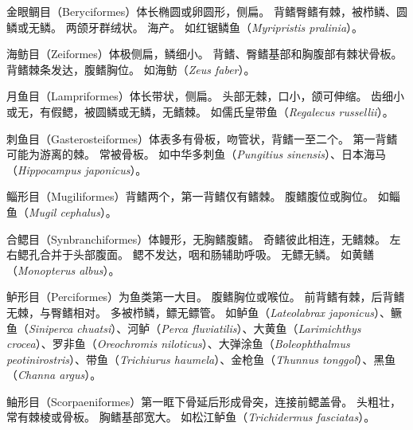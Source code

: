 \documentclass[11pt]{article}
\begin{document}
\newline

金眼鲷目（Beryciformes）体长椭圆或卵圆形，侧扁。
背鳍臀鳍有棘，被栉鳞、圆鳞或无鳞。
两颌牙群绒状。
海产。
如红锯鳞鱼（\textit{Myripristis pralinia}）。

\newline

海鲂目（Zeiformes）体极侧扁，鳞细小。
背鳍、臀鳍基部和胸腹部有棘状骨板。
背鳍棘条发达，腹鳍胸位。
如海鲂（\textit{Zeus faber}）。

\newline

月鱼目（Lampriformes）体长带状，侧扁。
头部无棘，口小，颌可伸缩。
齿细小或无，有假鳃，被圆鳞或无鳞，无鳍棘。
如儒氏皇带鱼（\textit{Regalecus russellii}）。

\newline

刺鱼目（Gasterosteiformes）体表多有骨板，吻管状，背鳍一至二个。
第一背鳍可能为游离的棘。
常被骨板。
如中华多刺鱼（\textit{Pungitius sinensis}）、日本海马（\textit{Hippocampus japonicus}）。

\newline

鲻形目（Mugiliformes）背鳍两个，第一背鳍仅有鳍棘。
腹鳍腹位或胸位。
如鲻鱼（\textit{Mugil cephalus}）。

\newline

合鳃目（Synbranchiformes）体鳗形，无胸鳍腹鳍。
奇鳍彼此相连，无鳍棘。
左右鳃孔合并于头部腹面。
鳃不发达，咽和肠辅助呼吸。
无鳔无鳞。
如黄鳝（\textit{Monopterus albus}）。

\newline

鲈形目（Perciformes）为鱼类第一大目。
腹鳍胸位或喉位。
前背鳍有棘，后背鳍无棘，与臀鳍相对。
多被栉鳞，鳔无鳔管。
如鲈鱼（\textit{Lateolabrax japonicus}）、鳜鱼（\textit{Siniperca chuatsi}）、河鲈（\textit{Perca fluviatilis}）、大黄鱼（\textit{Larimichthys crocea}）、罗非鱼（\textit{Oreochromis niloticus}）、大弹涂鱼（\textit{Boleophthalmus peotinirostris}）、带鱼（\textit{Trichiurus haumela}）、金枪鱼（\textit{Thunnus tonggol}）、黑鱼（\textit{Channa argus}）。

\newline

鲉形目（Scorpaeniformes）第一眶下骨延后形成骨突，连接前鳃盖骨。
头粗壮，常有棘棱或骨板。
胸鳍基部宽大。
如松江鲈鱼（\textit{Trichidermus fasciatas}）。

\newline
\end{document}
